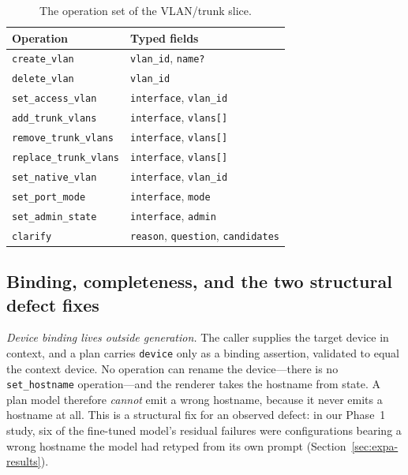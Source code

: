 \documentclass[conference]{IEEEtran}
\begin{document}
\begin{table}[t]
\centering
\caption{The operation set of the VLAN/trunk slice.}
\label{tab:ops}
\small
\begin{tabular}{@{}ll@{}}
\toprule
\textbf{Operation} & \textbf{Typed fields} \\
\midrule
\texttt{create\_vlan} & \texttt{vlan\_id}, \texttt{name?} \\
\texttt{delete\_vlan} & \texttt{vlan\_id} \\
\texttt{set\_access\_vlan} & \texttt{interface}, \texttt{vlan\_id} \\
\texttt{add\_trunk\_vlans} & \texttt{interface}, \texttt{vlans[]} \\
\texttt{remove\_trunk\_vlans} & \texttt{interface}, \texttt{vlans[]} \\
\texttt{replace\_trunk\_vlans} & \texttt{interface}, \texttt{vlans[]} \\
\texttt{set\_native\_vlan} & \texttt{interface}, \texttt{vlan\_id} \\
\texttt{set\_port\_mode} & \texttt{interface}, \texttt{mode} \\
\texttt{set\_admin\_state} & \texttt{interface}, \texttt{admin} \\
\midrule
\texttt{clarify} & \texttt{reason}, \texttt{question}, \texttt{candidates} \\
\bottomrule
\end{tabular}
\end{table}

\subsection{Binding, completeness, and the two structural defect fixes}

\emph{Device binding lives outside generation.} The caller supplies the target device in context, and a plan carries \texttt{device} only as a binding assertion, validated to equal the context device. No operation can rename the device---there is no \texttt{set\_hostname} operation---and the renderer takes the hostname from state. A plan model therefore \emph{cannot} emit a wrong hostname, because it never emits a hostname at all. This is a structural fix for an observed defect: in our Phase~1 study, six of the fine-tuned model's residual failures were configurations bearing a wrong hostname the model had retyped from its own prompt (Section~\ref{sec:expa-results}).
\end{document}
